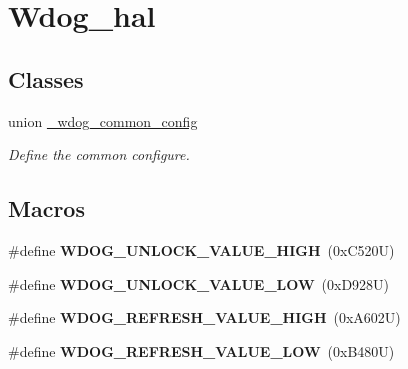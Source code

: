 \hypertarget{group__wdog__hal}{}\section{Wdog\+\_\+hal}
\label{group__wdog__hal}
\subsection*{Classes}
\begin{DoxyCompactItemize}
\item 
union \hyperlink{union__wdog__common__config}{\+\_\+wdog\+\_\+common\+\_\+config}
\begin{DoxyCompactList}\small\item\em Define the common configure. \end{DoxyCompactList}\end{DoxyCompactItemize}
\subsection*{Macros}
\begin{DoxyCompactItemize}
\item 
\#define {\bfseries W\+D\+O\+G\+\_\+\+U\+N\+L\+O\+C\+K\+\_\+\+V\+A\+L\+U\+E\+\_\+\+H\+I\+GH}~(0x\+C520\+U)\hypertarget{group__wdog__hal_ga5eb4cb6520ed8d76d92f7fed0e6bc70d}{}\label{group__wdog__hal_ga5eb4cb6520ed8d76d92f7fed0e6bc70d}

\item 
\#define {\bfseries W\+D\+O\+G\+\_\+\+U\+N\+L\+O\+C\+K\+\_\+\+V\+A\+L\+U\+E\+\_\+\+L\+OW}~(0x\+D928\+U)\hypertarget{group__wdog__hal_gaba9c3e63ac06eed0c8206705050e0669}{}\label{group__wdog__hal_gaba9c3e63ac06eed0c8206705050e0669}

\item 
\#define {\bfseries W\+D\+O\+G\+\_\+\+R\+E\+F\+R\+E\+S\+H\+\_\+\+V\+A\+L\+U\+E\+\_\+\+H\+I\+GH}~(0x\+A602\+U)\hypertarget{group__wdog__hal_ga4c7b691c66ca0647605ef1db03ab82c3}{}\label{group__wdog__hal_ga4c7b691c66ca0647605ef1db03ab82c3}

\item 
\#define {\bfseries W\+D\+O\+G\+\_\+\+R\+E\+F\+R\+E\+S\+H\+\_\+\+V\+A\+L\+U\+E\+\_\+\+L\+OW}~(0x\+B480\+U)\hypertarget{group__wdog__hal_ga4b4c200b5b239da273a0124c89d627ee}{}\label{group__wdog__hal_ga4b4c200b5b239da273a0124c89d627ee}

\end{DoxyCompactItemize}
